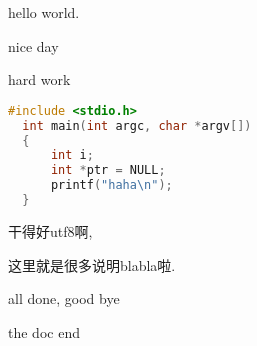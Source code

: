 \documentclass{article}
\newcommand{\zytbegin}{\begingroup \color{blue} \begin{CJK}{UTF8}{gbsn}}
\newcommand{\zytend}{\end{CJK} \endgroup}
\begin{document}
hello world.

\zytbegin

nice day

hard work


\begin{lstlisting}[language=C++]
  #include <stdio.h>
  int main(int argc, char *argv[])
  {
      int i;
      int *ptr = NULL;
      printf("haha\n");
  }
\end{lstlisting}

干得好utf8啊,

这里就是很多说明blabla啦.

all done,
good bye

\zytend

the doc end
\end{document}
